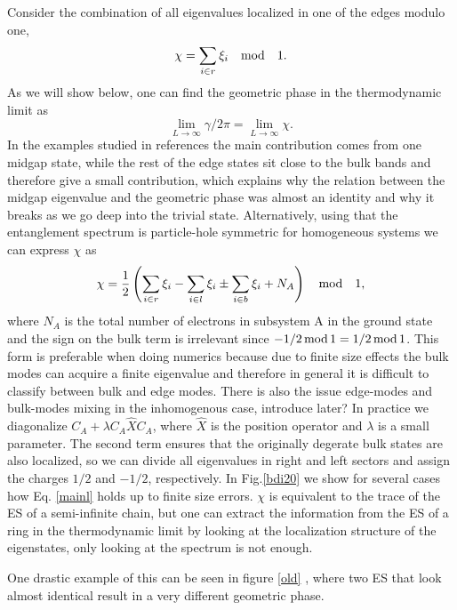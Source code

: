 \documentclass[twocolumn,amsmath,longbibliography,amssymb,superscriptaddress]{revtex4-1}
\newcommand{\carlos}[1]{{\color{red} #1}}
\begin{document}
Consider the combination of all eigenvalues localized in one of the edges modulo one,
\begin{equation}
\chi = \sum_{i \in r} \xi_i \quad {\rm mod} \quad 1. 
\end{equation}
As we will show below, one can find the geometric phase in the thermodynamic limit as
\begin{equation}
\lim_{L \rightarrow \infty}\gamma/2\pi =\lim_{L \rightarrow \infty} \chi.
\label{mainl}
\end{equation}
In the examples studied in references \cite{Ryu2006,Huang2012,Huang2012-2} the main contribution comes from one midgap state, while the rest of the edge states sit close to the bulk bands and therefore give a small contribution, which explains why the relation between the midgap eigenvalue and the geometric phase was almost an identity and why it breaks as we go deep into the trivial state. Alternatively, using that the entanglement spectrum is particle-hole symmetric for homogeneous systems we can express $\chi$ as
\begin{equation*}
\chi = \frac{1}{2} \left( \sum_{i\in r}\xi_i-\sum_{i\in l}\xi_i \pm \sum_{i\in b}\xi_i  + N_A \right) \quad {\rm mod} \quad 1,
\end{equation*}
where $N_A$ is the total number of electrons in subsystem A  in the ground state and the sign on the bulk term is irrelevant since $-1/2 \, {\rm mod} \, 1 = 1/2 \, {\rm mod} \, 1$. This form is preferable when doing numerics because due to finite size effects the bulk modes can acquire a finite eigenvalue and therefore in general it is difficult to classify between bulk and edge modes. \carlos{There is also the issue edge-modes and bulk-modes mixing in the inhomogenous case, introduce later?} In practice we diagonalize $C_A + \lambda C_A\hat{X}C_A$, where $\hat{X}$ is the position operator and $\lambda$ is a small parameter. The second term ensures that the originally degerate bulk states are also localized, so we can divide all eigenvalues in right and left sectors and assign the charges $1/2$ and $-1/2$, respectively. In Fig.\ref{bdi20} we show for several cases how Eq. \ref{mainl} holds up to finite size errors. $\chi$ is equivalent to the trace of the ES of a semi-infinite chain, but one can extract the information from the ES of a ring in the thermodynamic limit by looking at the localization structure of the eigenstates, only looking at the spectrum is not enough. 

One drastic example of this can be seen in figure \ref{old} , where two ES that look almost identical result in a very different geometric phase. 
\end{document}
